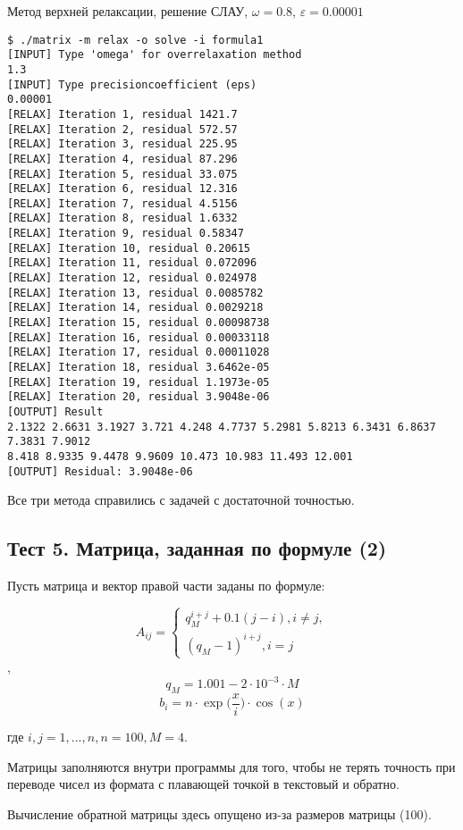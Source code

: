 \documentclass[a4paper,11pt]{report}
\begin{document}
\begin{bash}
\caption{Метод верхней релаксации, решение СЛАУ, $\omega = 0.8$, $\varepsilon = 0.00001$}
\begin{verbatim}
$ ./matrix -m relax -o solve -i formula1 
[INPUT] Type 'omega' for overrelaxation method
1.3
[INPUT] Type precisioncoefficient (eps)
0.00001
[RELAX] Iteration 1, residual 1421.7
[RELAX] Iteration 2, residual 572.57
[RELAX] Iteration 3, residual 225.95
[RELAX] Iteration 4, residual 87.296
[RELAX] Iteration 5, residual 33.075
[RELAX] Iteration 6, residual 12.316
[RELAX] Iteration 7, residual 4.5156
[RELAX] Iteration 8, residual 1.6332
[RELAX] Iteration 9, residual 0.58347
[RELAX] Iteration 10, residual 0.20615
[RELAX] Iteration 11, residual 0.072096
[RELAX] Iteration 12, residual 0.024978
[RELAX] Iteration 13, residual 0.0085782
[RELAX] Iteration 14, residual 0.0029218
[RELAX] Iteration 15, residual 0.00098738
[RELAX] Iteration 16, residual 0.00033118
[RELAX] Iteration 17, residual 0.00011028
[RELAX] Iteration 18, residual 3.6462e-05
[RELAX] Iteration 19, residual 1.1973e-05
[RELAX] Iteration 20, residual 3.9048e-06
[OUTPUT] Result
2.1322 2.6631 3.1927 3.721 4.248 4.7737 5.2981 5.8213 6.3431 6.8637 7.3831 7.9012
8.418 8.9335 9.4478 9.9609 10.473 10.983 11.493 12.001 
[OUTPUT] Residual: 3.9048e-06
\end{verbatim}
\end{bash}

Все три метода справились с задачей с достаточной точностью.

\subsection*{Тест 5. Матрица, заданная по формуле (2)}

Пусть матрица и вектор правой части заданы по формуле:

$$A_{ij} = \begin{cases}
       q_M^{i + j} + 0.1(j - i), i \neq j, \\
       (q_M - 1)^{i + j}, i = j
      \end{cases}
$$,
$$ q_M = 1.001 - 2 \cdot 10^{-3} \cdot M $$
$$ b_i = n \cdot \exp \Big(\frac{x}{i}\Big) \cdot \cos(x) $$

где $i, j = 1,...,n, n = 100, M = 4$.

Матрицы заполняются внутри программы для того, чтобы не терять точность при переводе чисел из формата с плавающей точкой в
текстовый и обратно.

Вычисление обратной матрицы здесь опущено из-за размеров матрицы (100).
\end{document}
